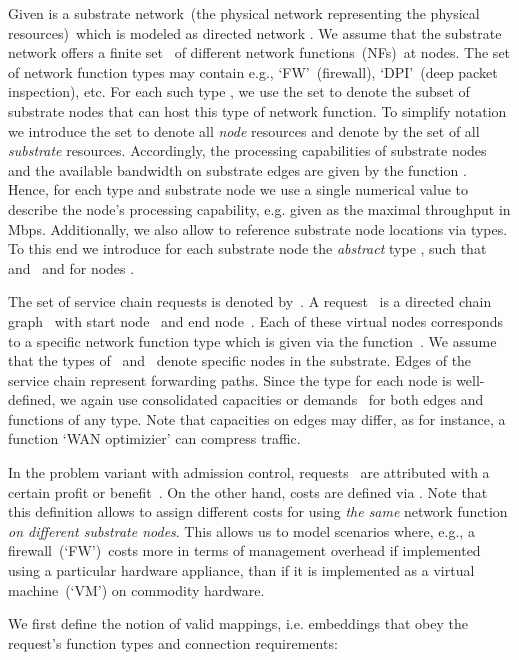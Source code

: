 \documentclass[10pt, conference, letterpaper]{IEEEtran}
\begin{document}
Given is a substrate network~(the physical network representing
the physical resources)~which is modeled as directed network 
. We assume that the substrate network 
offers a finite set~ of different network 
functions~(NFs)~at nodes. The set of network function types may contain e.g., `FW'~(firewall), `DPI'~(deep packet inspection), etc. For each such type , we use the set  to denote the subset of substrate nodes that can host this type of 
network function. To simplify notation we introduce the set  to denote all \emph{node} resources and denote by  the set of all \emph{substrate} resources.
Accordingly, the processing capabilities of substrate nodes and the available bandwidth on substrate edges are given by the function . Hence, for each type and substrate node we use a single numerical value to describe the node's processing capability, e.g. given as the maximal throughput in Mbps. 
Additionally, we also allow to reference substrate node locations via types. To this end we introduce for each substrate node  the \emph{abstract} type , such that  and~ and  for nodes . 


The set of service chain requests is denoted by~. 
A request~ is a directed chain graph~ 
with start node~ and end node~. 
Each of these virtual nodes corresponds to a specific network function type 
which is given via the function~. We assume 
that the types of~ and~ denote specific nodes in the substrate. 
Edges of the service chain represent forwarding paths. 
Since the type for each node is well-defined, we again use consolidated 
capacities or demands~ for both edges and functions of any type. 
Note that capacities on edges may differ, as for instance, a 
function `WAN optimizier' can compress traffic. 

In the problem variant with admission control, requests~ are attributed with a 
certain profit or benefit~. On the other hand, costs are defined via . Note that this definition allows to assign different costs for using \emph{the same} network function \emph{on different substrate nodes}. This allows us to model 
scenarios where, e.g., 
a firewall~(`FW')~costs more in terms of management overhead if implemented using a particular hardware appliance, than 
if it is implemented as a virtual machine~(`VM')
on commodity hardware.

We first define the notion of valid mappings, i.e. embeddings that obey the request's function types and connection requirements:
\end{document}
